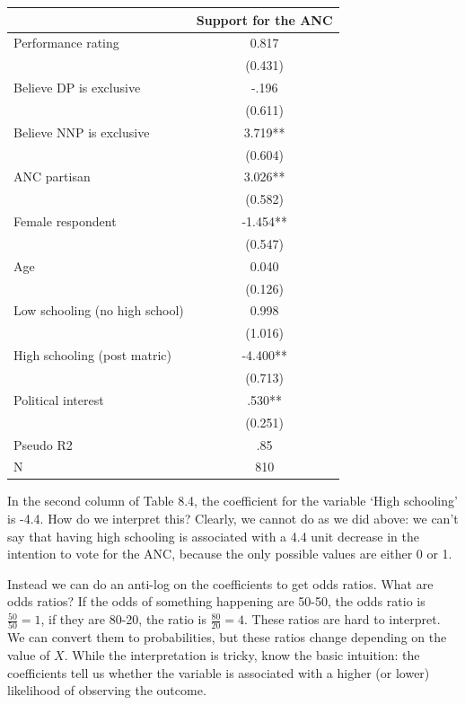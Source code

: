 \documentclass{book}
\begin{document}
\begin{longtable}[]{@{}lc@{}}
\toprule
& Support for the ANC \\
\midrule
\endhead
Performance rating & 0.817 \\
& (0.431) \\
Believe DP is exclusive & -.196 \\
& (0.611) \\
Believe NNP is exclusive & 3.719** \\
& (0.604) \\
ANC partisan & 3.026** \\
& (0.582) \\
Female respondent & -1.454** \\
& (0.547) \\
Age & 0.040 \\
& (0.126) \\
Low schooling (no high school) & 0.998 \\
& (1.016) \\
High schooling (post matric) & -4.400** \\
& (0.713) \\
Political interest & .530** \\
& (0.251) \\
Pseudo R2 & .85 \\
N & 810 \\
\bottomrule
\end{longtable}

In the second column of Table 8.4, the coefficient for the variable `High
schooling' is -4.4. How do we interpret this? Clearly, we cannot do as we did
above: we can't say that having high schooling is associated with a 4.4 unit
decrease in the intention to vote for the ANC, because the only possible
values are either 0 or 1.

Instead we can do an anti-log on the coefficients to get odds ratios. What are
odds ratios? If the odds of something happening are 50-50, the odds ratio is
\(\frac{50}{50}=1\), if they are 80-20, the ratio is \(\frac{80}{20}=4\).
These ratios are hard to interpret. We can convert them to probabilities, but
these ratios change depending on the value of \(X\). While the interpretation
is tricky, know the basic intuition: the coefficients tell us whether the
variable is associated with a higher (or lower) likelihood of observing the
outcome.
\end{document}
